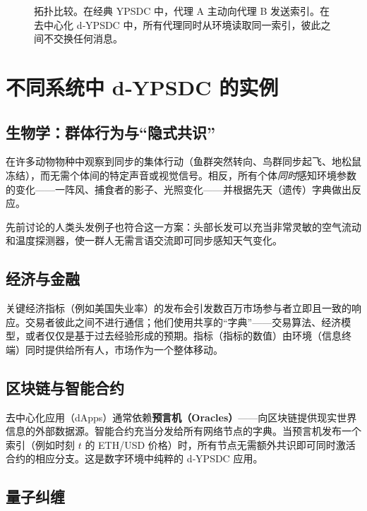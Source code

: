 \documentclass[11pt,a4paper]{article}
\begin{document}
\begin{figure}[htbp]
\begin{otherlanguage}{english}
\begin{tikzpicture}
			\end{tikzpicture}
		\end{otherlanguage}
		\caption{拓扑比较。在经典 YPSDC 中，代理 A 主动向代理 B 发送索引。在去中心化 d‑YPSDC 中，所有代理同时从环境读取同一索引，彼此之间不交换任何消息。}
		\label{fig:topology}
	\end{figure}
	
	\section{不同系统中 d‑YPSDC 的实例}
	
	\subsection{生物学：群体行为与“隐式共识”}
	
	在许多动物物种中观察到同步的集体行动（鱼群突然转向、鸟群同步起飞、地松鼠冻结），而无需个体间的特定声音或视觉信号。相反，所有个体\emph{同时}感知环境参数的变化——一阵风、捕食者的影子、光照变化——并根据先天（遗传）字典做出反应。
	
	先前讨论的人类头发例子也符合这一方案：头部长发可以充当非常灵敏的空气流动和温度探测器，使一群人无需言语交流即可同步感知天气变化。
	
	\subsection{经济与金融}
	
	关键经济指标（例如美国失业率）的发布会引发数百万市场参与者立即且一致的响应。交易者彼此之间不进行通信；他们使用共享的“字典”——交易算法、经济模型，或者仅仅是基于过去经验形成的预期。指标（指标的数值）由环境（信息终端）同时提供给所有人，市场作为一个整体移动。
	
	\subsection{区块链与智能合约}
	
	去中心化应用（dApps）通常依赖\textbf{预言机（Oracles）}——向区块链提供现实世界信息的外部数据源。智能合约充当分发给所有网络节点的字典。当预言机发布一个索引（例如时刻 \(t\) 的 ETH/USD 价格）时，所有节点无需额外共识即可同时激活合约的相应分支。这是数字环境中纯粹的 d‑YPSDC 应用。
	
	\subsection{量子纠缠}
	
\end{document}
